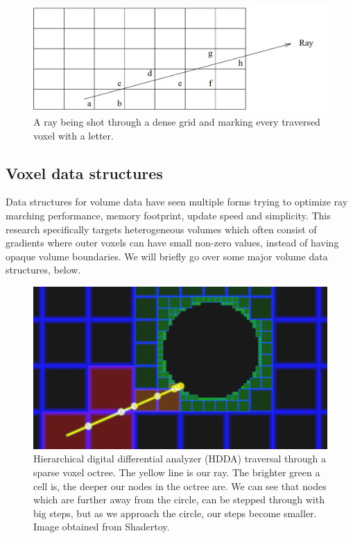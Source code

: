 \clearpage

\begin{figure}
    \centering
    \includegraphics[width=\linewidth]{figures/dda.png}
    \caption{A ray being shot through a dense grid and marking every traversed voxel with a letter. \cite{amanatides1987fast}}
    \label{fig:dda_traversal}
\end{figure}

\subsection{Voxel data structures} \label{related_work:voxel_data_structures}
Data structures for volume data have seen multiple forms trying to optimize ray marching performance, memory footprint, update speed and simplicity. This research specifically targets heterogeneous volumes which often consist of gradients where outer voxels can have small non-zero values, instead of having opaque volume boundaries. We will briefly go over some major volume data structures, below.

\begin{figure}
    \centering
    \includegraphics[width=\linewidth]{figures/esvo_traversal.png}
    \caption{Hierarchical digital differential analyzer (HDDA) traversal through a sparse voxel octree. The yellow line is our ray. The brighter green a cell is, the deeper our nodes in the octree are. We can see that nodes which are further away from the circle, can be stepped through with big steps, but as we approach the circle, our steps become smaller. Image obtained from Shadertoy.}
    \label{fig:esvo}
\end{figure}

